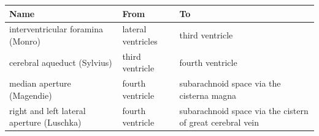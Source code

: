 \begin{longtable}[]{@{}lll@{}}
\toprule
\begin{minipage}[b]{0.34\columnwidth}\raggedright
Name\strut
\end{minipage} & \begin{minipage}[b]{0.34\columnwidth}\raggedright
From\strut
\end{minipage} & \begin{minipage}[b]{0.23\columnwidth}\raggedright
To\strut
\end{minipage}\tabularnewline
\midrule
\endhead
\begin{minipage}[t]{0.34\columnwidth}\raggedright
interventricular foramina (Monro)\strut
\end{minipage} & \begin{minipage}[t]{0.34\columnwidth}\raggedright
lateral ventricles\strut
\end{minipage} & \begin{minipage}[t]{0.23\columnwidth}\raggedright
third ventricle\strut
\end{minipage}\tabularnewline
\begin{minipage}[t]{0.34\columnwidth}\raggedright
cerebral aqueduct (Sylvius)\strut
\end{minipage} & \begin{minipage}[t]{0.34\columnwidth}\raggedright
third ventricle\strut
\end{minipage} & \begin{minipage}[t]{0.23\columnwidth}\raggedright
fourth ventricle\strut
\end{minipage}\tabularnewline
\begin{minipage}[t]{0.34\columnwidth}\raggedright
median aperture (Magendie)\strut
\end{minipage} & \begin{minipage}[t]{0.34\columnwidth}\raggedright
fourth ventricle\strut
\end{minipage} & \begin{minipage}[t]{0.23\columnwidth}\raggedright
subarachnoid space via the cisterna magna\strut
\end{minipage}\tabularnewline
\begin{minipage}[t]{0.34\columnwidth}\raggedright
right and left lateral aperture (Luschka)\strut
\end{minipage} & \begin{minipage}[t]{0.34\columnwidth}\raggedright
fourth ventricle\strut
\end{minipage} & \begin{minipage}[t]{0.23\columnwidth}\raggedright
subarachnoid space via the cistern of great cerebral vein\strut
\end{minipage}\tabularnewline
\bottomrule
\end{longtable}

